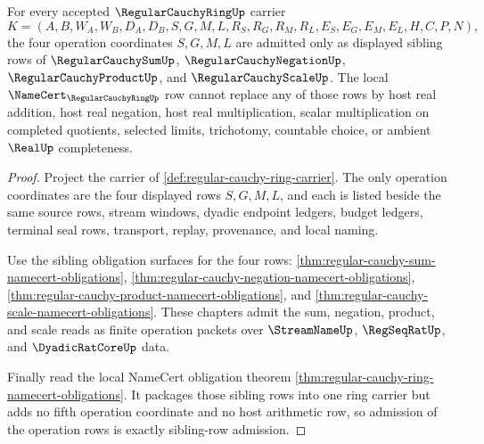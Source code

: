 \begin{theorem}
\label{thm:regular-cauchy-ring-operation-row-admission}
For every accepted $\RegularCauchyRingUp$ carrier
$$
K=(A,B,W_A,W_B,D_A,D_B,S,G,M,L,R_S,R_G,R_M,R_L,E_S,E_G,E_M,E_L,H,C,P,N),
$$
the four operation coordinates $S,G,M,L$ are admitted only as displayed sibling rows of $\RegularCauchySumUp$, $\RegularCauchyNegationUp$, $\RegularCauchyProductUp$, and $\RegularCauchyScaleUp$. The local $\NameCert_{\RegularCauchyRingUp}$ row cannot replace any of those rows by host real addition, host real negation, host real multiplication, scalar multiplication on completed quotients, selected limits, trichotomy, countable choice, or ambient $\RealUp$ completeness.
\end{theorem}
\begin{proof}
Project the carrier of \autoref{def:regular-cauchy-ring-carrier}. The only operation coordinates are the four displayed rows $S,G,M,L$, and each is listed beside the same source rows, stream windows, dyadic endpoint ledgers, budget ledgers, terminal seal rows, transport, replay, provenance, and local naming.

Use the sibling obligation surfaces for the four rows: \autoref{thm:regular-cauchy-sum-namecert-obligations}, \autoref{thm:regular-cauchy-negation-namecert-obligations}, \autoref{thm:regular-cauchy-product-namecert-obligations}, and \autoref{thm:regular-cauchy-scale-namecert-obligations}. These chapters admit the sum, negation, product, and scale reads as finite operation packets over $\StreamNameUp$, $\RegSeqRatUp$, and $\DyadicRatCoreUp$ data.

Finally read the local NameCert obligation theorem \autoref{thm:regular-cauchy-ring-namecert-obligations}. It packages those sibling rows into one ring carrier but adds no fifth operation coordinate and no host arithmetic row, so admission of the operation rows is exactly sibling-row admission.
\end{proof}


